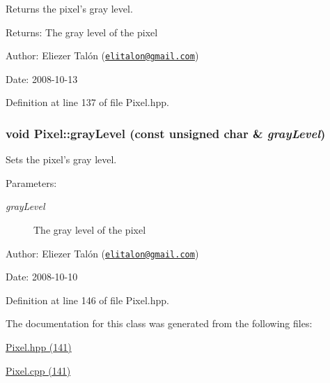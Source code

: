 Returns the pixel's gray level. 

\begin{Desc}
\item[Returns:]The gray level of the pixel\end{Desc}
\begin{Desc}
\item[Author:]Eliezer Talón (\href{mailto:elitalon@gmail.com}{\tt elitalon@gmail.com}) \end{Desc}
\begin{Desc}
\item[Date:]2008-10-13 \end{Desc}


Definition at line 137 of file Pixel.hpp.\hypertarget{class_pixel_d00a337e0d9765daafe3017f2d819df8}{
\subsubsection[grayLevel]{\setlength{\rightskip}{0pt plus 5cm}void Pixel::grayLevel (const unsigned char \& {\em grayLevel})}}
\label{class_pixel_d00a337e0d9765daafe3017f2d819df8}


Sets the pixel's gray level. 

\begin{Desc}
\item[Parameters:]
\begin{description}
\item[{\em grayLevel}]The gray level of the pixel\end{description}
\end{Desc}
\begin{Desc}
\item[Author:]Eliezer Talón (\href{mailto:elitalon@gmail.com}{\tt elitalon@gmail.com}) \end{Desc}
\begin{Desc}
\item[Date:]2008-10-10 \end{Desc}


Definition at line 146 of file Pixel.hpp.

The documentation for this class was generated from the following files:\begin{CompactItemize}
\item 
\hyperlink{_pixel_8hpp}{Pixel.hpp (141)}\item 
\hyperlink{_pixel_8cpp}{Pixel.cpp (141)}\end{CompactItemize}
